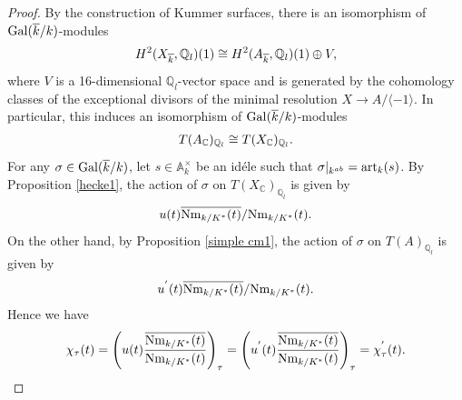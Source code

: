 \documentclass[reqno,a4paper,11pt]{amsart}
\theoremstyle{definition}
\theoremstyle{definition}
\begin{document}
      \begin{proof}By the construction of Kummer surfaces, there is an isomorphism of ${\rm Gal}(\overline{k}/k)$-modules
      \begin{align}
          H^{2}(X_{\overline{k}}, \mathbb{Q}_{l})(1)\cong H^{2}(A_{\overline{k}}, \mathbb{Q}_{l})(1)\oplus V, \notag 
      \end{align}
      where $V$ is a 16-dimensional $\mathbb{Q}_{l}$-vector space and is generated by the cohomology classes of the exceptional divisors of the minimal resolution $X\to A/\langle-1\rangle$. In particular, this induces an isomorphism of ${\rm Gal}(\overline{k}/k)$-modules
          \begin{align}
              T(A_{\mathbb{C}})_{\mathbb{Q}_{l}}\cong T(X_{\mathbb{C}})_{\mathbb{Q}_{l}}.  \notag 
          \end{align}
          For any $\sigma\in{\rm Gal}(\overline{k}/k)$, let $s\in \mathbb{A}^{\times}_{k}$ be an id\'ele such that  $\sigma|_{k^{ab}}={\rm art}_{k}(s)$.  By Proposition \ref{hecke1}, the action of $\sigma$ on $T(X_{\mathbb{C}})_{\mathbb{Q}_{l}}$ is given by 
          \begin{align}u(t)\overline{{\rm Nm}_{k/K^{\ast}}(t)}/{\rm Nm}_{k/K^{\ast}}(t).\notag 
          \end{align}On the other hand, by  Proposition \ref{simple cm1}, the action of $\sigma$ on $T(A)_{\mathbb{Q}_{l}}$ is given by 
          \begin{align}
          u^{'}(t)\overline{{\rm Nm}_{k/K^{\ast}}(t)}/{\rm Nm}_{k/K^{\ast}}(t). \notag 
          \end{align}Hence we have
          \begin{align}
              \chi_{\tau}(t)=\left(u(t)\frac{\overline{{\rm Nm}_{k/K^{\ast}}(t)}}{{\rm Nm}_{k/K^{\ast}}(t)}\right)_{\tau}=\left(u^{'}(t)\frac{\overline{{\rm Nm}_{k/K^{\ast}}(t)}}{{\rm Nm}_{k/K^{\ast}}(t)}\right)_{\tau}=\chi^{'}_{\tau}(t).\notag 
          \end{align}
      \end{proof} 
\end{document}
